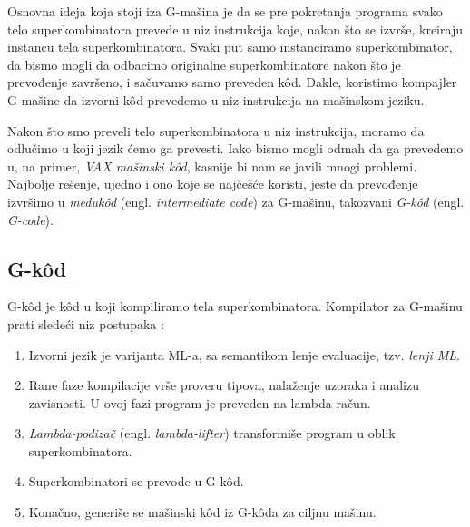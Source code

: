 Osnovna ideja koja stoji iza G-mašina je da se pre pokretanja programa svako telo superkombinatora prevede u niz instrukcija koje, nakon što se izvrše, kreiraju instancu tela superkombinatora. Svaki put samo instanciramo superkombinator, da bismo mogli da odbacimo originalne superkombinatore nakon što je prevođenje završeno, i sačuvamo samo preveden k\^ od. Dakle, koristimo kompajler G-mašine da izvorni k\^ od prevedemo u niz instrukcija na mašinskom jeziku.

Nakon što smo preveli telo superkombinatora u niz instrukcija, moramo da odlučimo u koji jezik ćemo ga prevesti. Iako bismo mogli odmah da ga prevedemo u, na primer, {\em VAX mašinski k\^ od}, kasnije bi nam se javili mnogi problemi. Najbolje rešenje, ujedno i ono koje se najčešće koristi, jeste da prevođenje izvršimo u \textit{međuk\^ od} (engl. \textit{intermediate code}) za G-mašinu, takozvani {\em G-k\^ od} (engl. \textit{G-code}).

\subsection{G-k\^ od}

G-k\^ od je k\^ od u koji kompiliramo tela superkombinatora. Kompilator za G-mašinu prati sledeći niz postupaka \cite{the-implementation-of-functional-programming-languages, abstract-machines}:

\begin{enumerate}
	\item Izvorni jezik je varijanta ML-a, sa semantikom lenje evaluacije, tzv. {\em lenji ML}.
	\item Rane faze kompilacije vrše proveru tipova, nalaženje uzoraka i analizu zavisnosti. U ovoj fazi program je preveden na lambda račun.
	\item \textit{Lambda-podizač} (engl. \textit{lambda-lifter}) transformiše program u oblik superkombinatora.   
	\item Superkombinatori se prevode u G-k\^ od.
	\item Konačno, generiše se mašinski k\^ od iz G-k\^ oda za ciljnu mašinu.
\end{enumerate}

